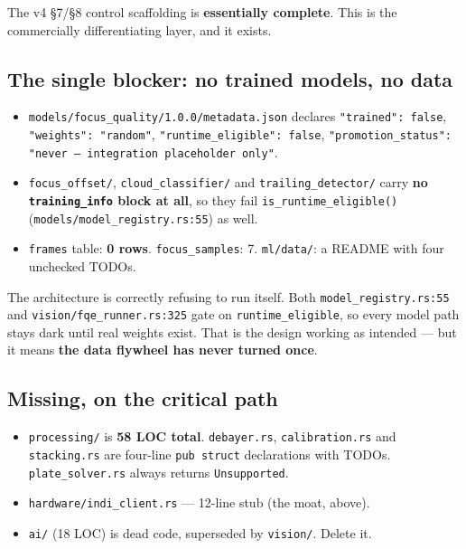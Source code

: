 \documentclass[11pt]{article}
\begin{document}
\begin{keybox}
The v4 §7/§8 control scaffolding is \textbf{essentially complete}. This is the
commercially differentiating layer, and it exists.
\end{keybox}

\subsection{The single blocker: no trained models, no data}

\begin{redbox}
\begin{itemize}[leftmargin=1.2em,itemsep=2pt]
  \item \texttt{models/focus\_quality/1.0.0/metadata.json} declares
        \texttt{"trained": false}, \texttt{"weights": "random"},
        \texttt{"runtime\_eligible": false},
        \texttt{"promotion\_status": "never --- integration placeholder only"}.
  \item \texttt{focus\_offset/}, \texttt{cloud\_classifier/} and
        \texttt{trailing\_detector/} carry \textbf{no \texttt{training\_info}
        block at all}, so they fail \texttt{is\_runtime\_eligible()}
        (\texttt{models/model\_registry.rs:55}) as well.
  \item \texttt{frames} table: \textbf{0 rows}. \texttt{focus\_samples}: 7.
        \texttt{ml/data/}: a README with four unchecked TODOs.
\end{itemize}
\end{redbox}

The architecture is correctly refusing to run itself. Both
\texttt{model\_registry.rs:55} and \texttt{vision/fqe\_runner.rs:325} gate on
\texttt{runtime\_eligible}, so every model path stays dark until real weights
exist. That is the design working as intended --- but it means \textbf{the data
flywheel has never turned once}.

\subsection{Missing, on the critical path}

\begin{itemize}[leftmargin=1.4em,itemsep=2pt]
  \item \texttt{processing/} is \textbf{58 LOC total}. \texttt{debayer.rs},
        \texttt{calibration.rs} and \texttt{stacking.rs} are four-line
        \texttt{pub struct} declarations with TODOs.
        \texttt{plate\_solver.rs} always returns \texttt{Unsupported}.
  \item \texttt{hardware/indi\_client.rs} --- 12-line stub (the moat, above).
  \item \texttt{ai/} (18 LOC) is dead code, superseded by \texttt{vision/}.
        Delete it.
\end{itemize}
\end{document}
